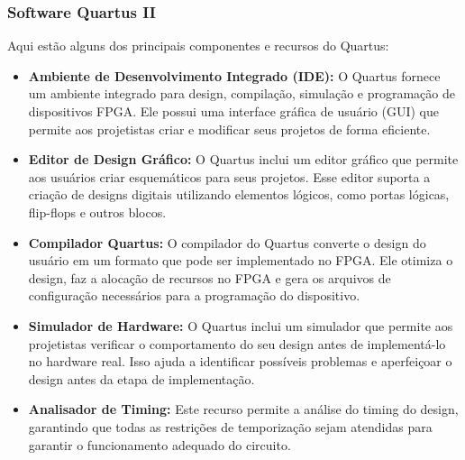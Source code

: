 \documentclass{CPSPresentation}
\begin{document}
\begin{frame}
	\frametitle{Software Quartus II}

	
	Aqui estão alguns dos principais componentes e recursos do Quartus:
	
	\begin{itemize}
		\justifying
		[triangle]
		\item \textbf{Ambiente de Desenvolvimento Integrado (IDE):} O Quartus fornece um ambiente integrado para design, compilação, simulação e programação de dispositivos FPGA. Ele possui uma interface gráfica de usuário (GUI) que permite aos projetistas criar e modificar seus projetos de forma eficiente.
		
		\item \textbf{Editor de Design Gráfico:} O Quartus inclui um editor gráfico que permite aos usuários criar esquemáticos para seus projetos. Esse editor suporta a criação de designs digitais utilizando elementos lógicos, como portas lógicas, flip-flops e outros blocos.
		
		\item \textbf{Compilador Quartus:} O compilador do Quartus converte o design do usuário em um formato que pode ser implementado no FPGA. Ele otimiza o design, faz a alocação de recursos no FPGA e gera os arquivos de configuração necessários para a programação do dispositivo.
		
		\item \textbf{Simulador de Hardware:} O Quartus inclui um simulador que permite aos projetistas verificar o comportamento do seu design antes de implementá-lo no hardware real. Isso ajuda a identificar possíveis problemas e aperfeiçoar o design antes da etapa de implementação.
		
		\item \textbf{Analisador de Timing:} Este recurso permite a análise do timing do design, garantindo que todas as restrições de temporização sejam atendidas para garantir o funcionamento adequado do circuito.
	\end{itemize}
	
	
\end{frame}


\end{document}

